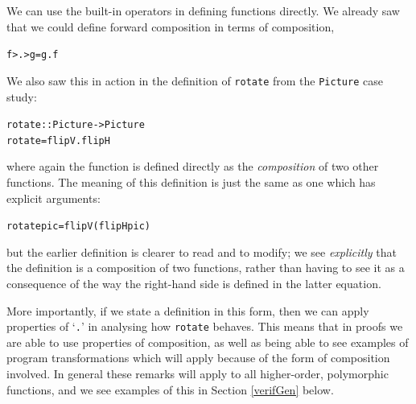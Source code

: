 We can use the built-in operators in defining functions directly. We already saw that we could define forward composition in terms of composition,
\begin{alltt}
f >.> g = g.f
\end{alltt}
We also saw this in action in the definition of \texttt{rotate} from the \texttt{Picture} case study:
\begin{alltt}
rotate :: Picture -> Picture
rotate = flipV . flipH
\end{alltt}
where again the function is defined directly as the \emph{composition} of two other functions.
The meaning of this definition is just the same as one which has explicit arguments:
\begin{alltt}
rotate pic = flipV (flipH pic)
\end{alltt}
but the earlier definition is clearer to read and to
modify; we see \emph{explicitly} that the definition is a composition
of two functions, rather than having to see it as a consequence of the
way the right-hand side is defined in the latter equation.

More importantly, if we state a definition in this form, then we can
apply properties of `\texttt{.}' in analysing how \texttt{rotate}
behaves. This means that in proofs we are able to use properties of composition, as
well as being able to see examples of program transformations which will apply because of the form of composition involved. In general these remarks will apply to all 
higher-order, polymorphic functions, and we see examples of this in Section 
\ref{verifGen} below.



